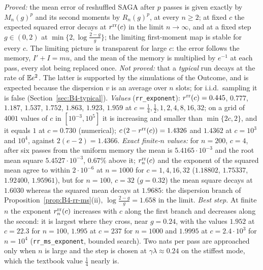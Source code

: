 \begin{remark}\label{rem:B4-rr-status}
\emph{Proved:} the mean error of reshuffled SAGA after $p$ passes is given exactly by $M_n(g)^p$ and its second moments by $R_n(g)^p$, at every $n\ge2$; at fixed $c$ the expected squared error decays at $r^{\rm rr}(c)$ in the limit $n\to\infty$, and at a fixed step $g\in(0,2)$ at $\min\{2,\log\frac{2-g}g\}$; the limiting first-moment map is stable for every $c$. The limiting picture is transparent for large $c$: the error follows the memory, $I'+I=mu$, and the mean of the memory is multiplied by $e^{-1}$ at each pass, every slot being replaced once.
\emph{Not proved:} that a \emph{typical} run decays at the rate of $\mathbb{E} e^2$. The latter is supported by the simulations of the Outcome, and is expected because the dispersion $v$ is an average over $n$ slots; for i.i.d.\ sampling it is false (Section~\ref{sec:B4-typical}).
\emph{Values} (\texttt{rr\_exponent}): $r^{\rm rr}(c)=0.445$, $0.777$, $1.187$, $1.537$, $1.752$, $1.863$, $1.923$, $1.959$ at $c=\frac14,\frac12,1,2,4,8,16,32$; on a grid of $4001$ values of $c$ in $[10^{-3},10^5]$ it is increasing and smaller than $\min\{2c,2\}$, and it equals $1$ at $c=0.730$ (numerical); $c\,(2-r^{\rm rr}(c))=1.4326$ and $1.4362$ at $c=10^3$ and $10^4$, against $2(e-2)=1.4366$. \emph{Exact finite-$n$ values:} for $n=200$, $c=4$, after six passes from the uniform memory the mean is $5.4165\cdot10^{-3}$ and the root mean square $5.4527\cdot10^{-3}$, $0.67\%$ above it; $r^{\rm rr}_n(c)$ and the exponent of the squared mean agree to within $2\cdot10^{-6}$ at $n=1000$ for $c=1,4,16,32$ ($1.18802$, $1.75337$, $1.92400$, $1.95961$), but for $n=100$, $c=32$ ($g=0.32$) the mean square decays at $1.6030$ whereas the squared mean decays at $1.9685$: the dispersion branch of Proposition~\ref{prop:B4-rr-ms}(ii), $\log\frac{2-g}g=1.658$ in the limit.
\emph{Best step.} At finite $n$ the exponent $r^{\rm rr}_n(c)$ increases with $c$ along the first branch and decreases along the second: it is largest where they cross, near $g=0.24$, with the values $1.952$ at $c=22.3$ for $n=100$, $1.995$ at $c=237$ for $n=1000$ and $1.9995$ at $c=2.4\cdot10^3$ for $n=10^4$ (\texttt{rr\_ms\_exponent}, bounded search). Two nats per pass are approached only when $n$ is large and the step is chosen at $\gamma\lambda\approx0.24$ on the stiffest mode, which the textbook value $\frac14$ nearly is.
\end{remark}

